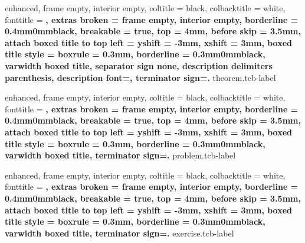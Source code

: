 \theoremstyle{definition}

\newtheorem{section-lemma}{Lema}[section]
\newtheorem{section-theorem}{Teorema}[section]
\newtheorem{section-problem}{Problema}[section]
\newtheorem{section-exercise}{Ejercicio}[section]
\newtheorem{section-corollary}{Corolario}[section]
\newtheorem{section-definition}{Definición}[section]

\newtheorem{case}{Caso}
\newtheorem{example}{Ejemplo}
\newtheorem{problem}{Problema}
\newtheorem{remark}{Observación}
\newtheorem{corollary}{Corolario}

\newtheorem*{note}{Nota}
\newtheorem*{definition}{Definición}


{
    enhanced,
    frame empty,
    interior empty,
    coltitle = black,
    colbacktitle = white,
    fonttitle = \bfseries,
    extras broken = {frame empty, interior empty},
    borderline = {0.4mm}{0mm}{black},
    breakable = true,
    top = 4mm,
    before skip = 3.5mm,
    attach boxed title to top left = {yshift = -3mm, xshift = 3mm},
    boxed title style = {boxrule = 0.3mm, borderline = {0.3mm}{0mm}{black}},
    varwidth boxed title,
    separator sign none, description delimiters parenthesis,
    description font=\bfseries,
    terminator sign={.\hspace{1mm}}
}
{theorem.tcb-label}

{
    enhanced,
    frame empty,
    interior empty,
    coltitle = black,
    colbacktitle = white,
    fonttitle = \bfseries,
    extras broken = {frame empty, interior empty},
    borderline = {0.4mm}{0mm}{black},
    breakable = true,
    top = 4mm,
    before skip = 3.5mm,
    attach boxed title to top left = {yshift = -3mm, xshift = 3mm},
    boxed title style = {boxrule = 0.3mm, borderline = {0.3mm}{0mm}{black}},
    varwidth boxed title,
    terminator sign={.\hspace{1mm}}
}
{problem.tcb-label}

{
    enhanced,
    frame empty,
    interior empty,
    coltitle = black,
    colbacktitle = white,
    fonttitle = \bfseries,
    extras broken = {frame empty, interior empty},
    borderline = {0.4mm}{0mm}{black},
    breakable = true,
    top = 4mm,
    before skip = 3.5mm,
    attach boxed title to top left = {yshift = -3mm, xshift = 3mm},
    boxed title style = {boxrule = 0.3mm, borderline = {0.3mm}{0mm}{black}},
    varwidth boxed title,
    terminator sign={.\hspace{1mm}}
}
{exercise.tcb-label}

